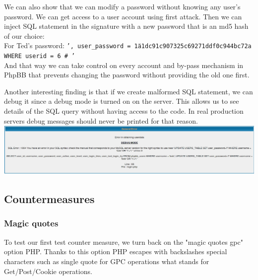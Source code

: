 \documentclass[12pt, a4paper, pdflatex]{article}
\begin{document}
We can also show that we can modify a password without knowing any user's password. We can get access to a user account using first attack. Then we can inject SQL statement in the signature with a new password that is an md5 hash of our choice:\\
For Ted's password: \texttt{', user\_password = \"1a1dc91c907325c69271ddf0c944bc72a WHERE userid = 6 \# '}\\
And that way we can take control on every account and by-pass mechanism in PhpBB that prevents changing the password without providing the old one first.

Another interesting finding is that if we create malformed SQL statement, we can debug it since a debug mode is turned on on the server. This allows us to see details of the SQL query without having access to the code. In real production servers debug messages should never be printed for that reason.\\
\includegraphics[width=.95\textwidth]{gfx/sql/debug.png}

\subsection{Countermeasures}

\subsubsection{Magic quotes}

To test our first test counter measure, we turn back on the "magic quotes gpc" option PHP. Thanks to this option PHP escapes with backslashes special characters such as single quote for GPC operations what stands for Get/Post/Cookie operations\cite{phpman}.
\end{document}
